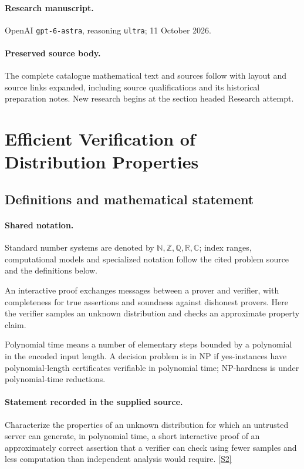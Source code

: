 \documentclass[11pt]{article}
\begin{document}
\paragraph{Research manuscript.} OpenAI \texttt{gpt-6-astra}, reasoning \texttt{ultra}; 11 October 2026.
\paragraph{Preserved source body.} The complete catalogue mathematical text and sources follow with layout and source links expanded, including source qualifications and its historical preparation notes. New research begins at the section headed Research attempt.

\section{Efficient Verification of Distribution Properties}\label{statement}

\subsection{Definitions and mathematical statement}

\paragraph{Shared notation.}Standard number systems are denoted by $\mathbb N,\mathbb Z,\mathbb Q,\mathbb R,\mathbb C$; index ranges, computational models and specialized notation follow the cited problem source and the definitions below.


An interactive proof exchanges messages between a prover and verifier, with completeness for true assertions and soundness against dishonest provers. Here the verifier samples an unknown distribution and checks an approximate property claim.

Polynomial time means a number of elementary steps bounded by a polynomial in the encoded input length. A decision problem is in $\mathrm{NP}$ if yes-instances have polynomial-length certificates verifiable in polynomial time; NP-hardness is under polynomial-time reductions.
\paragraph{Statement recorded in the supplied source.}
Characterize the properties of an unknown distribution for which an untrusted server can generate, in polynomial time, a short interactive proof of an approximately correct assertion that a verifier can check using fewer samples and less computation than independent analysis would require. \href{https://doi.org/10.4171/owr/2025/3}{[S2]}
\end{document}
